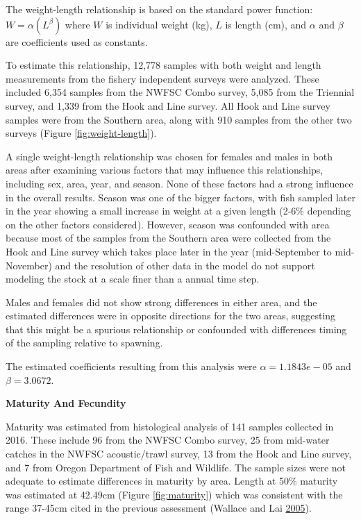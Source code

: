 \documentclass[12pt,]{article}
\begin{document}
The weight-length relationship is based on the standard power function:
\(W = \alpha(L^\beta)\) where \(W\) is individual weight (kg), \(L\) is
length (cm), and \(\alpha\) and \(\beta\) are coefficients used as
constants.

To estimate this relationship, 12,778 samples with both weight and
length measurements from the fishery independent surveys were analyzed.
These included 6,354 samples from the NWFSC Combo survey, 5,085 from the
Triennial survey, and 1,339 from the Hook and Line survey. All Hook and
Line survey samples were from the Southern area, along with 910 samples
from the other two surveys (Figure \ref{fig:weight-length}).

A single weight-length relationship was chosen for females and males in
both areas after examining various factors that may influence this
relationships, including sex, area, year, and season. None of these
factors had a strong influence in the overall results. Season was one of
the bigger factors, with fish sampled later in the year showing a small
increase in weight at a given length (2-6\% depending on the other
factors considered). However, season was confounded with area because
most of the samples from the Southern area were collected from the Hook
and Line survey which takes place later in the year (mid-September to
mid-November) and the resolution of other data in the model do not
support modeling the stock at a scale finer than a annual time step.

Males and females did not show strong differences in either area, and
the estimated differences were in opposite directions for the two areas,
suggesting that this might be a spurious relationship or confounded with
differences timing of the sampling relative to spawning.

The estimated coefficients resulting from this analysis were
\(\alpha = 1.1843e-05\) and \(\beta = 3.0672\).

\vspace{.5cm}

\textbf{Maturity And Fecundity}

Maturity was estimated from histological analysis of 141 samples
collected in 2016. These include 96 from the NWFSC Combo survey, 25 from
mid-water catches in the NWFSC acoustic/trawl survey, 13 from the Hook
and Line survey, and 7 from Oregon Department of Fish and Wildlife. The
sample sizes were not adequate to estimate differences in maturity by
area. Length at 50\% maturity was estimated at 42.49cm (Figure
\ref{fig:maturity}) which was consistent with the range 37-45cm cited in
the previous assessment (Wallace and Lai
\protect\hyperlink{ref-Wallace2005}{2005}).
\end{document}
